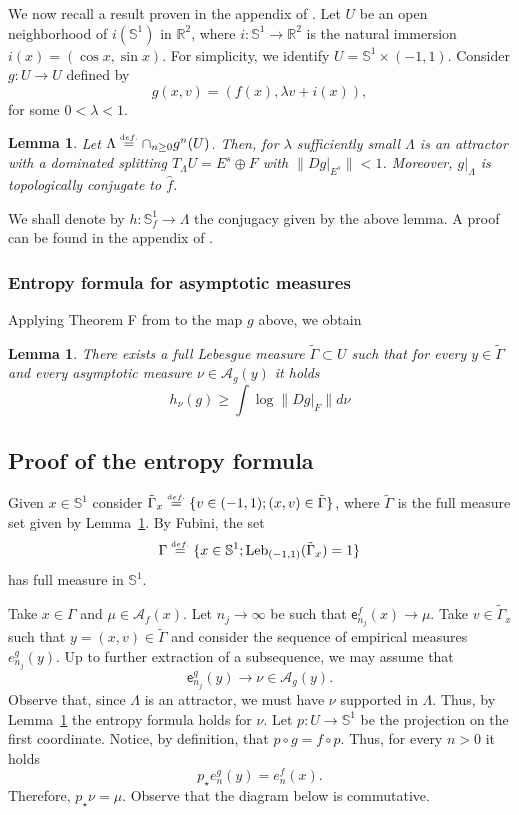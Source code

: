 \documentclass[12pt,a4paper,twoside]{article}
\theoremstyle{plain}
\newtheorem{lemma}[theorem]{Lemma}
\theoremstyle{definition}
\newcommand{\R}{{\mathbb R}}
\newcommand{\T}{{\mathbb{S}^1}}
\newcommand{\cA}{{\mathcal A}}
\newcommand{\eqdef}{\stackrel{\scriptscriptstyle\textrm def.}{=}}
\newcommand{\Leb}{\operatorname{Leb}}
\newcommand{\tg}{\tilde{\Gamma}}
\newcommand{\emp}{\mathsf e}
\begin{document}
We now recall a result proven in the appendix of \cite{VianaYang}. Let $U$ be an open neighborhood of $i(\mathbb{S}^1)$ in $\R^2$, where $i:\mathbb{S}^1\to\R^2$ is the natural immersion $i(x)=(\cos x,\sin x)$. For simplicity, we identify $U=\mathbb{S}^1\times(-1,1)$. Consider $g:U\to U$ defined by
\[
g(x,v)=(f(x),\lambda v+i(x)),
\]
for some $0<\lambda<1$. 

\begin{lemma}
    \label{lem:vianayang}
Let $\Lambda\eqdef\cap_{n\geq 0}g^n(U)$. Then, for $\lambda$ sufficiently small $\Lambda$ is an attractor with a dominated splitting $T_{\Lambda}U=E^s\oplus F$ with $\|Dg|_{E^s}\|<1$. Moreover, $g|_{\Lambda}$ is topologically conjugate to $\hat{f}$.
\end{lemma}

We shall denote by $h:\mathbb{S}^1_f\to\Lambda$ the conjugacy given by the above lemma. A proof can be found in the appendix of \cite{VianaYang}.

\subsubsection{Entropy formula for asymptotic measures}

Applying Theorem F from \cite{CYZ} to the map $g$ above, we obtain

\begin{lemma}
    \label{lem:cyz}
There exists a full Lebesgue measure $\tilde{\Gamma}\subset U$ such that for every $y\in\tilde{\Gamma}$ and every asymptotic measure $\nu\in\cA_g(y)$ it holds
\[
h_{\nu}(g)\geq\int\log\|Dg|_{F}\|d\nu
\]
\end{lemma}

\subsection{Proof of the entropy formula}
Given $x\in\T$ consider $\tg_x\eqdef\{v\in(-1,1);(x,v)\in\tg\}$, where $\tg$ is the full measure set given by Lemma~\ref{lem:cyz}. By Fubini, the set 
\[
\Gamma\eqdef\{x\in\T;\Leb_{(-1,1)}(\tg_x)=1\}
\]
has full measure in $\T$. 

Take $x\in\Gamma$ and $\mu\in\cA_f(x)$. Let $n_j\to\infty$ be such that $\emp_{n_j}^f(x)\to\mu$. Take $v\in\tg_x$ such that $y=(x,v)\in\tg$ and consider the sequence of empirical measures $e^g_{n_j}(y)$. Up to further extraction of a subsequence, we may assume that 
\[
\emp^g_{n_j}(y)\to\nu\in\cA_g(y).
\]
Observe that, since $\Lambda$ is an attractor, we must have $\nu$ supported in $\Lambda$. Thus, by Lemma~\ref{lem:cyz} the entropy formula holds for $\nu$. Let $p:U\to\T$ be the projection on the first coordinate. Notice, by definition, that $p\circ g=f\circ p$. Thus, for every $n>0$ it holds
\[
p_{\star}e^g_n(y)=e^f_n(x).
\]
Therefore, $p_{\star}\nu=\mu$. Observe that the diagram below is commutative.
\end{document}
